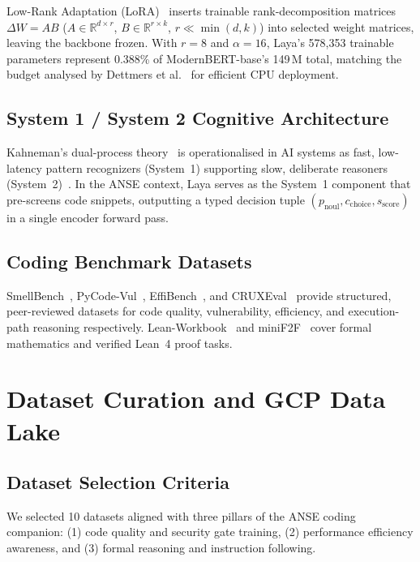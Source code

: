 \documentclass[conference]{IEEEtran}
\begin{document}
Low-Rank Adaptation (LoRA)~\cite{hu2022lora} inserts trainable rank-decomposition matrices
$\Delta W = AB$ ($A \in \mathbb{R}^{d \times r}$, $B \in \mathbb{R}^{r \times k}$, $r \ll \min(d, k)$)
into selected weight matrices, leaving the backbone frozen. With $r{=}8$ and $\alpha{=}16$,
Laya's 578{,}353 trainable parameters represent 0.388\% of ModernBERT-base's 149\,M total,
matching the budget analysed by Dettmers et al.~\cite{dettmers2024qlora} for efficient CPU
deployment.

\subsection{System 1 / System 2 Cognitive Architecture}

Kahneman's dual-process theory~\cite{kahneman2011thinking} is operationalised in AI systems
as fast, low-latency pattern recognizers (System~1) supporting slow, deliberate reasoners
(System~2)~\cite{bengio2019system2}. In the ANSE context, Laya serves as the System~1 component
that pre-screens code snippets, outputting a typed decision tuple $(p_\text{noul}, c_\text{choice}, s_\text{score})$
in a single encoder forward pass.

\subsection{Coding Benchmark Datasets}

SmellBench~\cite{tambon2024smellbench}, PyCode-Vul~\cite{ni2024pycodevul},
EffiBench~\cite{huang2024effibench}, and CRUXEval~\cite{gu2024cruxeval} provide
structured, peer-reviewed datasets for code quality, vulnerability, efficiency,
and execution-path reasoning respectively.
Lean-Workbook~\cite{ying2024leanworkbook} and miniF2F~\cite{zheng2022minif2f}
cover formal mathematics and verified Lean~4 proof tasks.

\section{Dataset Curation and GCP Data Lake}
\label{sec:datasets}

\subsection{Dataset Selection Criteria}

We selected 10 datasets aligned with three pillars of the ANSE coding companion:
(1) code quality and security gate training, (2) performance efficiency awareness,
and (3) formal reasoning and instruction following.
\end{document}
